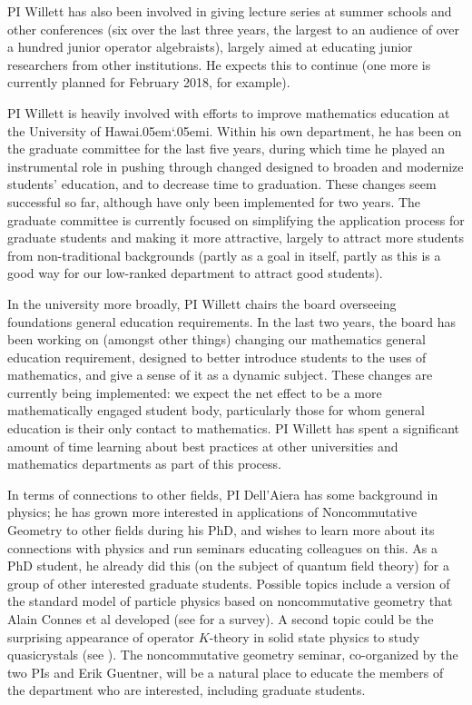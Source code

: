 \documentclass[11pt]{article}
\newcommand{\Hawaii}{Hawai\kern.05em`\kern.05em\relax i}
\theoremstyle{plain}
\theoremstyle{definition}
\theoremstyle{remark}
\begin{document}
PI Willett has also been involved in giving lecture series at summer schools and other conferences (six over the last three years, the largest to an audience of over a hundred junior operator algebraists), largely aimed at educating junior researchers from other institutions.  He expects this to continue (one more is currently planned for February 2018, for example).  

PI Willett is heavily involved with efforts to improve mathematics education at the University of \Hawaii.  Within his own department, he has been on the graduate committee for the last five years, during which time he played an instrumental role in pushing through changed designed to broaden and modernize students' education, and to decrease time to graduation.  These changes seem successful so far, although have only been implemented for two years.  The graduate committee is currently focused on simplifying the application process for graduate students and making it more attractive, largely to attract more students from non-traditional backgrounds (partly as a goal in itself, partly as this is a good way for our low-ranked department to attract good students).

In the university more broadly, PI Willett chairs the board overseeing foundations general education requirements.  In the last two years, the board has been working on (amongst other things) changing our mathematics general education requirement, designed to better introduce students to the uses of mathematics, and give a sense of it as a dynamic subject.  These changes are currently being implemented: we expect the net effect to be a more mathematically engaged student body, particularly those for whom general education is their only contact to mathematics.  PI Willett has spent a significant amount of time learning about best practices at other universities and mathematics departments as part of this process.  


In terms of connections to other fields, PI Dell'Aiera has some background in physics; %
he has grown more interested in applications of Noncommutative Geometry to other fields during his PhD, and wishes to learn more about its connections with physics and run seminars educating colleagues on this.  As a PhD student, he already did this (on the subject of quantum field theory) for a group of other interested graduate students.  Possible topics include a version of the standard model of particle physics based on noncommutative geometry that  Alain Connes et al developed (see \cite{ChamseddineConnes} for a survey). A second topic could be the surprising appearance of operator $K$-theory in solid state physics to study quasicrystals (see \cite{Bellissard}).  The noncommutative geometry seminar, co-organized by the two PIs and Erik Guentner, will be a natural place to educate the members of the department who are interested, including graduate students.







 

\pagebreak



\end{document}
